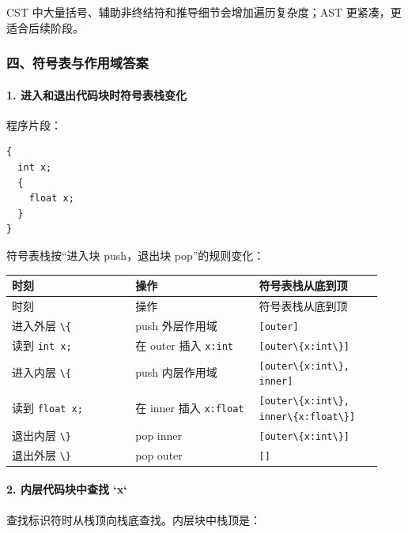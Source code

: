 \documentclass[UTF8]{ctexart}
\begin{document}
CST 中大量括号、辅助非终结符和推导细节会增加遍历复杂度；AST 更紧凑，更适合后续阶段。

\subsubsection*{四、符号表与作用域答案}

\paragraph*{1. 进入和退出代码块时符号表栈变化}

程序片段：

\begin{Verbatim}[fontsize=\small,breaklines=true]
{
  int x;
  {
    float x;
  }
}
\end{Verbatim}

符号表栈按“进入块 push，退出块 pop”的规则变化：

\begin{longtable}{|p{0.31\linewidth}|p{0.31\linewidth}|p{0.31\linewidth}|}
\hline
时刻 & 操作 & 符号表栈从底到顶 \\
\hline
\endfirsthead
时刻 & 操作 & 符号表栈从底到顶 \\
\hline
\endhead
进入外层 \texttt{\textbackslash{}\{} & push 外层作用域 & \texttt{[outer]} \\
\hline
读到 \texttt{int x;} & 在 outer 插入 \texttt{x:int} & \texttt{[outer\textbackslash{}\{x:int\textbackslash{}\}]} \\
\hline
进入内层 \texttt{\textbackslash{}\{} & push 内层作用域 & \texttt{[outer\textbackslash{}\{x:int\textbackslash{}\}, inner]} \\
\hline
读到 \texttt{float x;} & 在 inner 插入 \texttt{x:float} & \texttt{[outer\textbackslash{}\{x:int\textbackslash{}\}, inner\textbackslash{}\{x:float\textbackslash{}\}]} \\
\hline
退出内层 \texttt{\textbackslash{}\}} & pop inner & \texttt{[outer\textbackslash{}\{x:int\textbackslash{}\}]} \\
\hline
退出外层 \texttt{\textbackslash{}\}} & pop outer & \texttt{[]} \\
\hline
\end{longtable}

\paragraph*{2. 内层代码块中查找 `x`}

查找标识符时从栈顶向栈底查找。内层块中栈顶是：
\end{document}
